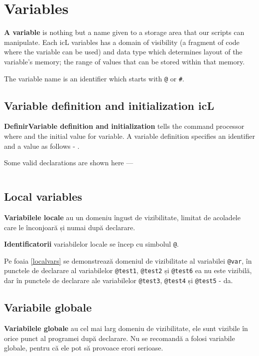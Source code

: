 \section{Variables}

\textbf{A variable} is nothing but a name given to a storage area that our scripts can manipulate. Each icL variables has a domain of visibility (a fragment of code where the variable can be used) and data type which determines layout of the variable's memory; the range of values that can be stored within that memory.

The variable name is an identifier which starts with \texttt{@} or \texttt{#}.

\subsection{Variable definition and initialization icL}

\textbf{DefinirVariable definition and initialization} tells the command processor where and the initial value for variable. A variable definition specifies an identifier and a value as follows -
.

Some valid declarations are shown here —
\inputminted[linenos]{icl}{../sources/initexample.icL}

\subsection{Local variables}

\textbf{Variabilele locale} au un domeniu îngust de vizibilitate, limitat de acoladele care le înconjoară și numai după declarare.

{\bf Identificatorii} variabilelor locale se încep cu simbolul \texttt{@}.

Pe foaia \ref{localvars} se demonstrează domeniul de vizibilitate al variabilei \texttt{@var}, în punctele de declarare al variabilelor \texttt{@test1}, \texttt{@test2} și \texttt{@test6} ea nu este vizibilă, dar în punctele de declarare ale variabilelor \texttt{@test3}, \texttt{@test4} și \texttt{@test5} - da.

\subsection{Variabile globale}

\textbf{Variabilele globale} au cel mai larg domeniu de vizibilitate, ele sunt vizibile în orice punct al programei după declarare. Nu se recomandă a folosi variabile globale, pentru că ele pot să provoace erori serioase.

